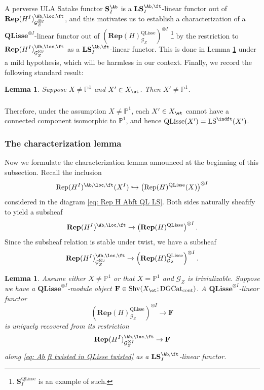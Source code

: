 \documentclass[10pt]{amsart}
\newcommand{\sssec}{\subsubsection}
\newtheorem{lemma}[subsubsection]{Lemma}
\theoremstyle{remark}
\newcommand{\pjl}{\mathbb{P}^1}
\newcommand{\on}{\operatorname}
\newcommand{\cG}{\mathcal{G}}
\newcommand{\DGcat}{\on{DGCat}_{\on{cont}}}
\newcommand{\Rep}{\on{Rep}}
\newcommand{\Shv}{\on{Shv}}
\newcommand{\LS}{\on{LS}}
\newcommand{\QLisse}{\on{QLisse}}
\begin{document}
A perverse ULA Satake functor $\mathbf{S}^{\Ab}_I$ is a $\mathbf{LS}^{\Ab,\ft}_I$-linear functor out of $\mathbf{Rep}(H^I)^{\Ab,\loc,\ft}_{\cG^{\boxtimes I}_Z}$, and this motivates us to establish a characterization of a $\mathbf{QLisse}^{\otimes I}$-linear functor out of $\left(\mathbf{Rep}(H)^{\QLisse}_{\cG_Z}\right)^{\otimes I}$ \footnote{$\mathbf{S}^{\QLisse}_I$ is an example of such.} by the restriction to $\mathbf{Rep}(H^I)^{\Ab,\loc,\ft}_{\cG^{\boxtimes I}_Z}$ as a $\mathbf{LS}^{\Ab,\ft}_I$-linear functor. This is done in Lemma \ref{lem: the characterization lemma} under a mild hypothesis, which will be harmless in our context. Finally, we record the following standard result:


\begin{lemma}
    Suppose $X\ne\pjl$ and $X'\in X_{\et}$. Then $X'\ne\pjl$.
\end{lemma}

\sssec{}\label{sssec: QLisse and ind ft under not P1}
Therefore, under the assumption $X\ne\pjl$, each $X'\in X_{\et}$ cannot have a connected component isomorphic to $\pjl$, and hence $\QLisse(X')=\LS^{\indft}(X')$.


    \sssec{The characterization lemma}
    Now we formulate the characterization lemma announced at the beginning of this subsection.
     Recall the inclusion
    \[\Rep(H^I)^{\Ab,\loc,\ft}(X^I)\hookrightarrow \left(\Rep(H)^{\QLisse}(X)\right)^{\otimes I}\]
    considered in the diagram \eqref{eq: Rep H Abft QL LS}.
    Both sides naturally sheafify to yield a subsheaf
    \[\mathbf{Rep}(H^I)^{\Ab,\loc,\ft}\rightarrow \left(\textbf{Rep}(H)^{\QLisse}\right)^{\otimes I}.\]
    Since the subsheaf relation is stable under twist, we have a subsheaf
    \begin{equation}\label{eq: Ab ft twisted in QLisse twisted}
        \mathbf{Rep}(H^I)^{\Ab,\loc,\ft}_{\cG^{\boxtimes I}_Z}\rightarrow \left(\textbf{Rep}(H)^{\QLisse}_{\cG_Z}\right)^{\otimes I}.
    \end{equation}

\begin{lemma}\label{lem: the characterization lemma}
    Assume either $X\ne \pjl$ or that $X=\pjl$ and $\cG_Z$ is trivializable. Suppose we have a $\mathbf{QLisse}^{\otimes I}$-module object $\mathbf{F}\in \Shv(X_{\et};\DGcat)$. A $\mathbf{QLisse}^{\otimes I}$-linear functor
    \begin{equation}\label{eq: functor out of Rep H QLisse}
        \left(\mathbf{Rep}(H)^{\QLisse}_{\cG_Z}\right)^{\otimes I}\rightarrow \mathbf{F}
    \end{equation}
        is uniquely recovered from its restriction 
        \begin{equation}\label{eq: functor out of Rep H I Ab ft}
            \mathbf{Rep}(H^I)^{\Ab,\loc,\ft}_{\cG^{\boxtimes I}_Z}\rightarrow \mathbf{F}
        \end{equation}
        along \eqref{eq: Ab ft twisted in QLisse twisted} as a $\mathbf{LS}^{\Ab,\ft}_I$-linear functor. 
    \end{lemma}
\end{document}
